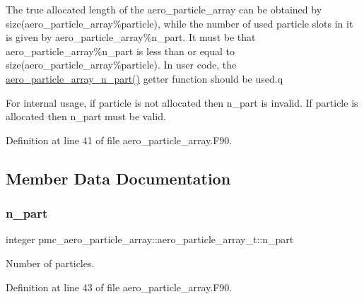The true allocated length of the aero\+\_\+particle\+\_\+array can be obtained by size(aero\+\_\+particle\+\_\+array\%particle), while the number of used particle slots in it is given by aero\+\_\+particle\+\_\+array\%n\+\_\+part. It must be that aero\+\_\+particle\+\_\+array\%n\+\_\+part is less than or equal to size(aero\+\_\+particle\+\_\+array\%particle). In user code, the {\ttfamily \mbox{\hyperlink{namespacepmc__aero__particle__array_a07eb4b0a376bb87a889b7d9070f46b90}{aero\+\_\+particle\+\_\+array\+\_\+n\+\_\+part()}}} getter function should be used.\+q

For internal usage, if {\ttfamily particle} is not allocated then {\ttfamily n\+\_\+part} is invalid. If {\ttfamily particle} is allocated then {\ttfamily n\+\_\+part} must be valid. 

Definition at line 41 of file aero\+\_\+particle\+\_\+array.\+F90.



\subsection{Member Data Documentation}
\mbox{\label{structpmc__aero__particle__array_1_1aero__particle__array__t_abea078a0a82f57ecedc6c0072241c69d}} 
\subsubsection{\texorpdfstring{n\+\_\+part}{n\_part}}
{\footnotesize\ttfamily integer pmc\+\_\+aero\+\_\+particle\+\_\+array\+::aero\+\_\+particle\+\_\+array\+\_\+t\+::n\+\_\+part}



Number of particles. 



Definition at line 43 of file aero\+\_\+particle\+\_\+array.\+F90.

\mbox{\label{structpmc__aero__particle__array_1_1aero__particle__array__t_adf475eb5715837eac48c805e42ead230}} 
